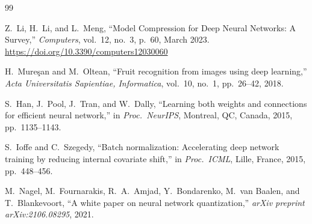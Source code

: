 \documentclass[letterpaper, 10 pt, conference]{ieeeconf}
\begin{document}
\begin{thebibliography}{99}

Z.\ Li, H.\ Li, and L.\ Meng,
``Model Compression for Deep Neural Networks: A Survey,''
\textit{Computers}, vol.~12, no.~3, p.~60, March 2023.
\url{https://doi.org/10.3390/computers12030060}

H.\ Mure\c{s}an and M.\ Oltean,
``Fruit recognition from images using deep learning,''
\textit{Acta Universitatis Sapientiae, Informatica},
vol.~10, no.~1, pp.~26--42, 2018.

S.\ Han, J.\ Pool, J.\ Tran, and W.\ Dally,
``Learning both weights and connections for efficient neural network,''
in \textit{Proc.\ NeurIPS}, Montreal, QC, Canada, 2015, pp.~1135--1143.

S.\ Ioffe and C.\ Szegedy,
``Batch normalization: Accelerating deep network training by reducing internal covariate shift,''
in \textit{Proc.\ ICML}, Lille, France, 2015, pp.~448--456.

M.\ Nagel, M.\ Fournarakis, R.\ A.\ Amjad, Y.\ Bondarenko,
M.\ van Baalen, and T.\ Blankevoort,
``A white paper on neural network quantization,''
\textit{arXiv preprint arXiv:2106.08295}, 2021.

\end{thebibliography}
\end{document}
